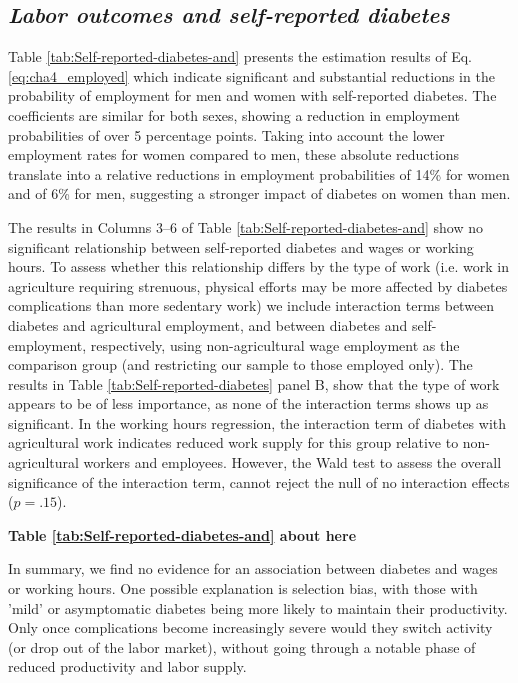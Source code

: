 \documentclass[12pt,english]{article}
\begin{document}
\subsection{\textit{Labor outcomes and self-reported diabetes}}

Table \ref{tab:Self-reported-diabetes-and} presents the estimation results of Eq. \ref{eq:cha4_employed} which indicate significant and substantial reductions in the probability of employment for men and women with self-reported diabetes. The coefficients are similar for both sexes, showing a reduction in employment probabilities of over 5 percentage points. Taking into account the lower employment rates for women compared to men, these absolute reductions translate into a relative reductions in employment probabilities of 14\% for women and of 6\% for men, suggesting a stronger impact of diabetes on women than men.

The results in Columns 3--6 of Table \ref{tab:Self-reported-diabetes-and} show no significant relationship between self-reported diabetes and wages or working hours. To assess whether this relationship differs by the type of work (i.e. work in agriculture requiring strenuous, physical efforts may be more affected by diabetes complications than more sedentary work) we include interaction terms between diabetes and agricultural employment, and between diabetes and self-employment, respectively, using non-agricultural wage employment as the comparison group (and restricting our sample to those employed only). The results in Table \ref{tab:Self-reported-diabetes} panel B, show that the type of work appears to be of less importance, as none of the interaction terms shows up as significant. In the working hours regression, the interaction term of diabetes with agricultural work indicates reduced work supply for this group relative to non-agricultural workers and employees. However, the Wald test to assess the overall significance of the interaction term, cannot  reject the null of no interaction effects ($p = .15$).

\begin{center}
	\textbf{Table \ref{tab:Self-reported-diabetes-and} about here}
\end{center}

In summary, we find no evidence for an association between diabetes and wages or working hours. One possible explanation is selection bias, with those with 'mild' or asymptomatic diabetes being more likely to maintain their productivity. Only once complications become increasingly severe would they switch activity (or drop out of the labor market), without going through a notable phase of reduced productivity and labor supply.
\end{document}

